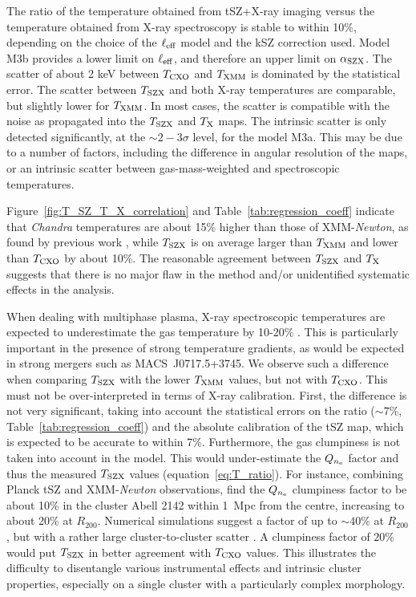 \documentclass[twocolumn,traditabstract]{aa}
\def\TSZ {T_{\rm SZX}}
\def \TXC {T_{\rm CXO}}
\def \TXX {T_{\rm XMM}}
\def \TX {T_{\rm X}}
\begin{document}
The ratio of the temperature obtained from tSZ+X-ray imaging versus the temperature obtained from X-ray spectroscopy is stable to within 10\%, depending on the choice of the $\ell_{\rm eff}$ model and the kSZ correction used. Model M3b provides a lower limit on $\ell_{\rm eff}$, and therefore an upper limit on $\alpha_{\rm SZX}$. The scatter of about 2 keV between $\TXC$ and $\TXX$ is dominated by the statistical error. The scatter between $\TSZ$ and both X-ray temperatures are comparable, but slightly lower for $\TXX$. In most cases, the scatter is compatible with the noise as propagated into the $\TSZ$ and $\TX$ maps. The intrinsic scatter is only detected significantly, at the $\sim 2-3\sigma$ level, for the model M3a. This may be due to a number of factors, including the difference in angular resolution of the maps, or an intrinsic scatter between gas-mass-weighted and spectroscopic temperatures.

Figure~\ref{fig:T_SZ_T_X_correlation} and Table~\ref{tab:regression_coeff} indicate that \textit{Chandra} temperatures are about 15\% higher than those of XMM-\textit{Newton}, as found by previous work \citep{Mahdavi2013,sch15}, while $\TSZ$ is on average larger than $\TXX$ and lower than $\TXC$ by about 10\%. The reasonable agreement between $\TSZ$ and $\TX$ suggests that there is no major flaw in the method and/or unidentified systematic effects in the analysis.

When dealing with multiphase plasma, X-ray spectroscopic temperatures are expected to underestimate the gas temperature by 10-20\% \citep{Mathiesen2001,maz04}. This is particularly important in the presence of strong temperature gradients, as would be expected in strong mergers such as \mbox{MACS~J0717.5+3745}. We observe such a difference when comparing $\TSZ$ with the lower $\TXX$ values, but not with $\TXC$. This must not be over-interpreted in terms of X-ray calibration. First, the difference is not very significant, taking into account the statistical errors on the ratio ($\sim 7\%$, Table~\ref{tab:regression_coeff}) and the absolute calibration of the tSZ map, which is expected to be accurate to within 7\%. Furthermore, the gas clumpiness is not taken into account in the model. This would under-estimate the $Q_{n_{\rm e}}$ factor and thus the measured $\TSZ$ values (equation~\ref{eq:T_ratio}). For instance, combining Planck tSZ \citep{Planck2015I} and XMM-\textit{Newton} observations, \citet{Tchernin2016} find the $Q_{n_{\rm e}}$ clumpiness factor to be about 10\% in the cluster Abell 2142 within 1~Mpc from the centre, increasing to about 20\% at $R_{200}$. Numerical simulations suggest a factor of up to $\sim 40$\% at $R_{200}$, but with a rather large cluster-to-cluster scatter \citep[e.g.,][]{Nagai2011,Zhuravleva2013,Vazza2013}. A clumpiness factor of $20\%$ would put $\TSZ$ in better agreement with $\TXC$ values. This illustrates the difficulty to disentangle various instrumental effects and intrinsic cluster properties, especially on a single cluster with a particularly complex morphology.
\end{document}

